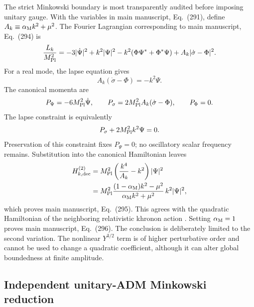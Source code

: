 \documentclass[aps,prd,reprint,onecolumn,notitlepage,nofootinbib,longbibliography,floatfix]{revtex4-2}
\theoremstyle{scstyle}
\theoremstyle{definition}
\theoremstyle{remark}
\newcommand{\mpl}{M_{\rm Pl}}
\begin{document}
The strict Minkowski boundary is most transparently audited before imposing unitary gauge. With the variables in main manuscript, Eq.~(291), define $A_k\equiv\alpha_{\rm M}k^2+\mu^2$. The Fourier Lagrangian corresponding to main manuscript, Eq.~(294) is
\begin{equation}
\frac{L_k}{\mpl^2}
=-3|\dot\Psi|^2+k^2|\Psi|^2
-k^2(\Phi\Psi^*+\Phi^*\Psi)
+A_k|\dot\sigma-\Phi|^2.
\label{eq:MinkowskiFourierL}
\end{equation}
For a real mode, the lapse equation gives
\begin{equation}
A_k(\dot\sigma-\Phi)=-k^2\Psi.
\label{eq:MinkowskiLapseConstraint}
\end{equation}
The canonical momenta are
\begin{equation}
P_\Psi=-6\mpl^2\dot\Psi,
\qquad
P_\sigma=2\mpl^2A_k(\dot\sigma-\Phi),
\qquad
P_\Phi=0.
\label{eq:MinkowskiMomenta}
\end{equation}
The lapse constraint is equivalently
\begin{equation}
P_\sigma+2\mpl^2k^2\Psi=0.
\label{eq:MinkowskiCanonicalConstraint}
\end{equation}
Preservation of this constraint fixes $P_\Psi=0$; no oscillatory scalar frequency remains. Substitution into the canonical Hamiltonian leaves
\begin{align}
H_{k,\rm dec}^{(2)}
&=\mpl^2\left(\frac{k^4}{A_k}-k^2\right)|\Psi|^2
\nonumber\\
&=\mpl^2
\frac{(1-\alpha_{\rm M})k^2-\mu^2}
{\alpha_{\rm M}k^2+\mu^2}\,k^2|\Psi|^2,
\label{eq:MinkowskiHamiltonianDerivation}
\end{align}
which proves main manuscript, Eq.~(295). This agrees with the quadratic Hamiltonian of the neighboring relativistic khronon action \cite{BlanchetSkordis2024}. Setting $\alpha_{\rm M}=1$ proves main manuscript, Eq.~(296). The conclusion is deliberately limited to the second variation. The nonlinear $Y^{3/2}$ term is of higher perturbative order and cannot be used to change a quadratic coefficient, although it can alter global boundedness at finite amplitude.

\subsection{Independent unitary-ADM Minkowski reduction}
\end{document}

